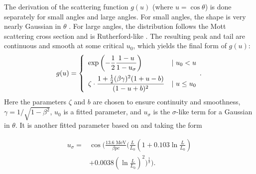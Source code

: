 \documentclass[portrait,a0paper,fontscale=0.285]{baposter} %
\begin{document}
\begin{poster}
{The derivation of the scattering function $g(u)$ (where  $u = \cos\theta$) is done separately for small angles and large angles. For small angles, the shape is very nearly Gaussian in $\theta$ \cite{GS}. For large angles, the distribution follows the Mott scattering cross section and is Rutherford-like \cite{Mott}. The resulting peak and tail are continuous and smooth at some critical $u_0$, which yields the final form of $g(u)$:
\begin{equation}
  g(u) = \left\{
  \begin{array}{lr}
    \displaystyle{\exp\left(-\frac{1}{2}\frac{1-u}{1-u_\sigma}\right)} & |\text{ } u_0 < u\vspace*{5pt}\\
    \displaystyle{\zeta\cdot\frac{1+\frac{1}{2}(\beta\gamma)^2(1+u-b)}{(1-u+b)^2}} & | \text{ } u \le u_0
  \end{array}.
\right.
\label{eq:scattering}
\end{equation}
Here the parameters $\zeta$ and $b$ are chosen to ensure continuity and smoothness, $\gamma=1/\sqrt{1-\beta^2}$, $u_0$ is a fitted parameter, and $u_\sigma$ is the $\sigma$-like term for a Gaussian in $\theta$. It is another fitted parameter based on \cite{highland} and taking the form

\begin{align*}
u_\sigma=&\cos\Bigg(\frac{13.6 \text{ MeV}}{\beta pc}\Bigg(\frac{L}{L_0}\left(1+0.103\ln\frac{L}{L_0}\right)\\
&+0.0038\left(\ln\frac{L}{L_0}\right)^2\Bigg)^\frac{1}{2}\Bigg).
\end{align*}
}


{
\renewcommand{\section}[2]{}%
{}

}


\end{poster}
\end{document}
